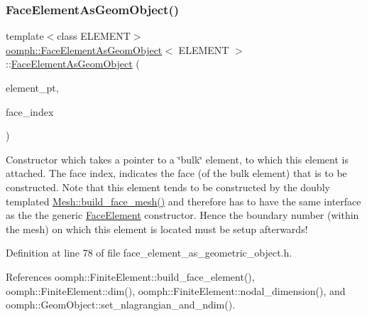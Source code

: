 \subsubsection{\texorpdfstring{Face\+Element\+As\+Geom\+Object()}{FaceElementAsGeomObject()}\hspace{0.1cm}{\footnotesize\ttfamily [1/2]}}
{\footnotesize\ttfamily template$<$class E\+L\+E\+M\+E\+NT$>$ \\
\hyperlink{classoomph_1_1FaceElementAsGeomObject}{oomph\+::\+Face\+Element\+As\+Geom\+Object}$<$ E\+L\+E\+M\+E\+NT $>$\+::\hyperlink{classoomph_1_1FaceElementAsGeomObject}{Face\+Element\+As\+Geom\+Object} (\begin{DoxyParamCaption}\item[{\hyperlink{classoomph_1_1FiniteElement}{Finite\+Element} $\ast$const \&}]{element\+\_\+pt,  }\item[{const int \&}]{face\+\_\+index }\end{DoxyParamCaption})\hspace{0.3cm}{\ttfamily [inline]}}



Constructor which takes a pointer to a \char`\"{}bulk\char`\"{} element, to which this element is attached. The face index, indicates the face (of the bulk element) that is to be constructed. Note that this element tends to be constructed by the doubly templated \hyperlink{classoomph_1_1Mesh_a93e1758501aeea3328291571ce501029}{Mesh\+::build\+\_\+face\+\_\+mesh()} and therefore has to have the same interface as the the generic \hyperlink{classoomph_1_1FaceElement}{Face\+Element} constructor. Hence the boundary number (within the mesh) on which this element is located must be setup afterwards! 



Definition at line 78 of file face\+\_\+element\+\_\+as\+\_\+geometric\+\_\+object.\+h.



References oomph\+::\+Finite\+Element\+::build\+\_\+face\+\_\+element(), oomph\+::\+Finite\+Element\+::dim(), oomph\+::\+Finite\+Element\+::nodal\+\_\+dimension(), and oomph\+::\+Geom\+Object\+::set\+\_\+nlagrangian\+\_\+and\+\_\+ndim().

\mbox{\label{classoomph_1_1FaceElementAsGeomObject_a86d211baa7a5bfa590c7467e863c6d07}} 
